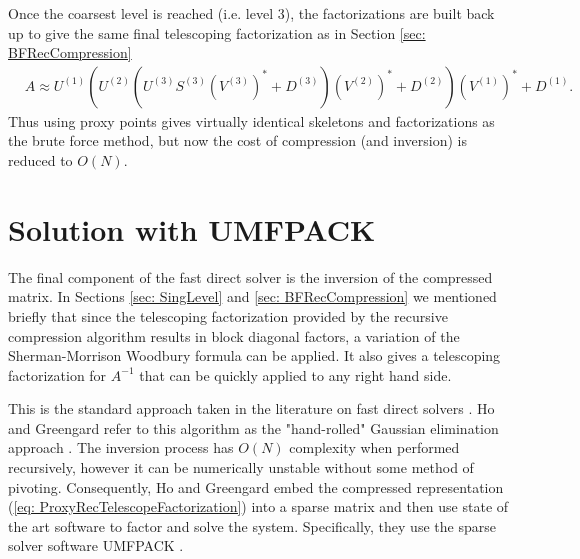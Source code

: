 \documentclass{sfuthesis}
\begin{document}
Once the coarsest level is reached (i.e. level 3), the factorizations are built back up to give the same final telescoping factorization as in Section \ref{sec: BFRecCompression} 
\begin{align}
	&A\approx U^{(1)}\left(U^{(2)}\left(U^{(3)}S^{(3)}{(V^{(3)})}^*+D^{(3)}\right){(V^{(2)})}^*+D^{(2)}\right){(V^{(1)})}^*+D^{(1)}. \label{eq: ProxyRecTelescopeFactorization} 
\end{align}
Thus using proxy points gives virtually identical skeletons and factorizations as the brute force method, but now the cost of compression (and inversion) is reduced to $O(N)$. 


\section{Solution with UMFPACK}
\label{sec: umfpack}
The final component of the fast direct solver is the inversion of the compressed matrix. In Sections \ref{sec: SingLevel} and \ref{sec: BFRecCompression} we mentioned briefly that since the telescoping factorization provided by the recursive compression algorithm results in block diagonal factors, a variation of the Sherman-Morrison Woodbury formula can be applied. It also gives a telescoping factorization for $A^{-1}$ that can be quickly applied to any right hand side. 

This is the standard approach taken in the literature on fast direct solvers \cite{GillYoungMart2012, MartRokh2005}. Ho and Greengard refer to this algorithm as the "hand-rolled" Gaussian elimination approach \cite{HoGreen2012}. The inversion process has $O(N)$ complexity when performed recursively, however it can be numerically unstable without some method of pivoting. Consequently, Ho and Greengard embed the compressed representation (\ref{eq: ProxyRecTelescopeFactorization}) into a sparse matrix and then use state of the art software to factor and solve the system. Specifically, they use the sparse solver software UMFPACK \cite{UMF}. 
\end{document}
